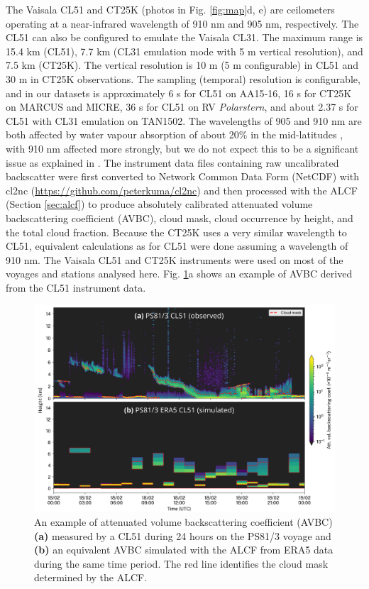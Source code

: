 \documentclass[12pt,a4paper]{article}
\begin{document}
The Vaisala CL51 and CT25K (photos in Fig. \ref{fig:map}d, e) are ceilometers
operating at a near-infrared wavelength of 910 nm and 905 nm, respectively.
The CL51 can also be configured to emulate the Vaisala CL31. The maximum range
is 15.4 km (CL51), 7.7 km (CL31 emulation mode with 5 m vertical resolution),
and 7.5 km (CT25K). The vertical resolution is 10 m (5 m configurable) in CL51
and 30 m in CT25K observations. The sampling (temporal) resolution is
configurable, and in our datasets is approximately 6 s for CL51 on AA15‐16, 16
s for CT25K on MARCUS and MICRE, 36 s for CL51 on RV \emph{Polarstern}, and
about 2.37 s for CL51 with CL31 emulation on TAN1502. The wavelengths of 905
and 910 nm are both affected by water vapour absorption of about 20\% in the
mid-latitudes \citep{wiegner2015,wiegner2019}, with 910 nm affected more
strongly, but we do not expect this to be a significant issue as explained in
\cite{kuma2021}.  The instrument data files containing raw uncalibrated
backscatter were first converted to Network Common Data Form (NetCDF) with
cl2nc (\url{https://github.com/peterkuma/cl2nc}) and then processed with the
ALCF (Section \ref{sec:alcf}) to produce absolutely calibrated attenuated
volume backscattering coefficient (AVBC), cloud mask, cloud occurrence by
height, and the total cloud fraction. Because the CT25K uses a very similar
wavelength to CL51, equivalent calculations as for CL51 were done assuming a
wavelength of 910 nm. The Vaisala CL51 and CT25K instruments were used on most
of the voyages and stations analysed here. Fig.  \ref{fig:example}a shows an
example of AVBC derived from the CL51 instrument data.

\begin{figure}[b!]
\centering
\includegraphics[width=\textwidth]{img/example.png}
\caption{
An example of attenuated volume backscattering coefficient (AVBC) \textbf{(a)}
measured by a CL51 during 24 hours on the PS81/3 voyage and \textbf{(b)} an
equivalent AVBC simulated with the ALCF from ERA5 data during the same time
period. The red line identifies the cloud mask determined by the ALCF.
}
\label{fig:example}
\end{figure}
\end{document}
